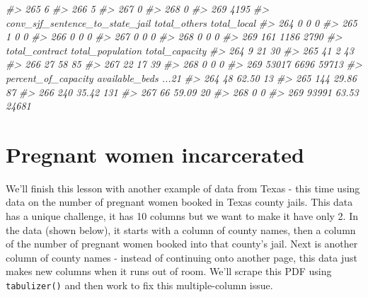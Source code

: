 \documentclass[
]{krantz}
\makeatletter
\newenvironment{Shaded}{\begin{snugshade}}{\end{snugshade}}
\newcommand{\CommentTok}[1]{\textcolor[rgb]{0.37,0.37,0.37}{\textit{#1}}}
\newenvironment{kframe}{%
\medskip{}
\setlength{\fboxsep}{.8em}
 \def\at@end@of@kframe{}%
 \ifinner\ifhmode%
  \def\at@end@of@kframe{\end{minipage}}%
  \begin{minipage}{\columnwidth}%
 \fi\fi%
 \def\FrameCommand##1{\hskip\@totalleftmargin \hskip-\fboxsep
 \colorbox{shadecolor}{##1}\hskip-\fboxsep
     \hskip-\linewidth \hskip-\@totalleftmargin \hskip\columnwidth}%
 \MakeFramed {\advance\hsize-\width
   \@totalleftmargin\z@ \linewidth\hsize
   \@setminipage}}%
 {\par\unskip\endMakeFramed%
 \at@end@of@kframe}
\renewenvironment{Shaded}{\begin{kframe}}{\end{kframe}}
\makeatother
\begin{document}
\begin{Shaded}
\begin{Highlighting}[]
\CommentTok{\#\textgreater{} 265                                  6}
\CommentTok{\#\textgreater{} 266                                  5}
\CommentTok{\#\textgreater{} 267                                  0}
\CommentTok{\#\textgreater{} 268                                  0}
\CommentTok{\#\textgreater{} 269                               4195}
\CommentTok{\#\textgreater{}     conv\_sjf\_sentence\_to\_state\_jail total\_others total\_local}
\CommentTok{\#\textgreater{} 264                               0            0           0}
\CommentTok{\#\textgreater{} 265                               1            0           0}
\CommentTok{\#\textgreater{} 266                               0            0           0}
\CommentTok{\#\textgreater{} 267                               0            0           0}
\CommentTok{\#\textgreater{} 268                               0            0           0}
\CommentTok{\#\textgreater{} 269                             161         1186        2790}
\CommentTok{\#\textgreater{}     total\_contract total\_population total\_capacity}
\CommentTok{\#\textgreater{} 264              9               21             30}
\CommentTok{\#\textgreater{} 265             41                2             43}
\CommentTok{\#\textgreater{} 266             27               58             85}
\CommentTok{\#\textgreater{} 267             22               17             39}
\CommentTok{\#\textgreater{} 268              0                0              0}
\CommentTok{\#\textgreater{} 269          53017             6696          59713}
\CommentTok{\#\textgreater{}     percent\_of\_capacity available\_beds ...21}
\CommentTok{\#\textgreater{} 264                  48          62.50    13}
\CommentTok{\#\textgreater{} 265                 144          29.86    87}
\CommentTok{\#\textgreater{} 266                 240          35.42   131}
\CommentTok{\#\textgreater{} 267                  66          59.09    20}
\CommentTok{\#\textgreater{} 268                   0                    0}
\CommentTok{\#\textgreater{} 269               93991          63.53 24681}
\end{Highlighting}
\end{Shaded}

\hypertarget{pregnant-women-incarcerated}{%
\section{Pregnant women incarcerated}\label{pregnant-women-incarcerated}}

We'll finish this lesson with another example of data from Texas - this time using data on the number of pregnant women booked in Texas county jails. This data has a unique challenge, it has 10 columns but we want to make it have only 2. In the data (shown below), it starts with a column of county names, then a column of the number of pregnant women booked into that county's jail. Next is another column of county names - instead of continuing onto another page, this data just makes new columns when it runs out of room. We'll scrape this PDF using \texttt{tabulizer()} and then work to fix this multiple-column issue.
\end{document}
